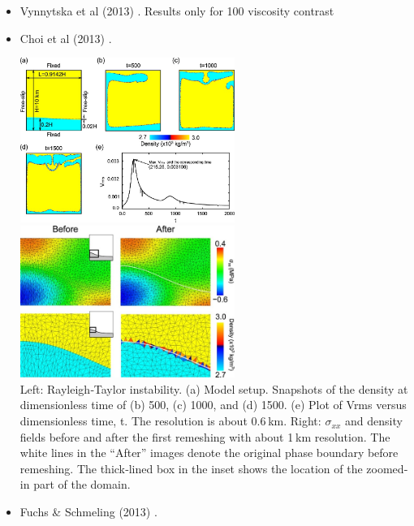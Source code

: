 \begin{itemize}
\item Vynnytska et al (2013) \cite{vyrc13}. Results only for 100 viscosity contrast


\item Choi et al (2013) \cite{chtl13}.

\begin{center}
\includegraphics[width=7cm]{images/benchmark_vaks97/chtl13_a}
\includegraphics[width=7cm]{images/benchmark_vaks97/chtl13_b}\\
{\captionfont 
Left:
Rayleigh‐Taylor instability. (a) Model setup. Snapshots of the density at dimensionless 
time of (b) 500, (c) 1000, and (d) 1500. (e) Plot of Vrms versus dimensionless time, t. 
The resolution is about 0.6 km. 
Right:
$\sigma_{xx}$ and density fields before and after the first remeshing with about 1 km resolution. 
The white lines in the “After” images denote the original phase boundary before remeshing. 
The thick‐lined box in the inset shows the location of the zoomed‐in part of the domain.}
\end{center}


\item Fuchs \& Schmeling (2013) \cite{fusc13}.


\end{itemize}
